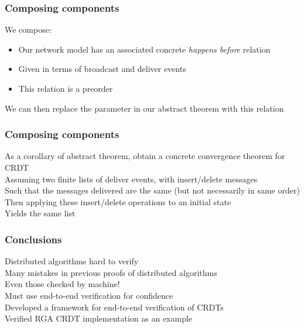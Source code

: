 \documentclass[professionalfonts,smallfonts]{beamer}
\begin{document}
\begin{frame}
\frametitle{Composing components}
We compose:
\begin{itemize}
\item
Our network model has an associated concrete \emph{happens before} relation
\item
Given in terms of broadcast and deliver events
\item
This relation is a preorder
\end{itemize}
We can then replace the parameter in our abstract theorem with this relation
\end{frame}

\begin{frame}
\frametitle{Composing components}
As a corollary of abstract theorem, obtain a concrete convergence theorem for CRDT
\\[1.5ex]
Assuming two finite lists of deliver events, with insert/delete messages
\\[1.5ex]
Such that the messages delivered are the same (but not necessarily in same order)
\\[1.5ex]
Then applying these insert/delete operations to an initial state
\\[1.5ex]
Yields the same list
\end{frame}

\begin{frame}
\frametitle{Conclusions}
Distributed algorithms hard to verify
\\[1.5ex]
Many mistakes in previous proofs of distributed algorithms
\\[1.5ex]
Even those checked by machine!
\\[1.5ex]
Must use end-to-end verification for confidence
\\[1.5ex]
Developed a framework for end-to-end verification of CRDTs
\\[1.5ex]
Verified RGA CRDT implementation as an example
\end{frame}
\end{document}
